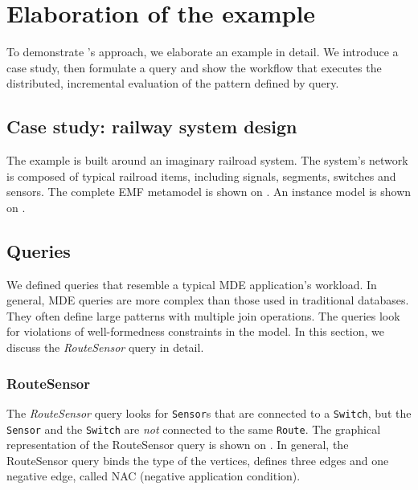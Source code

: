\section{Elaboration of the example}
\label{sec:elaboration}

To demonstrate \iqd{}'s approach, we elaborate an example in detail. We introduce a case study, then formulate a query and show the workflow that executes the distributed, incremental evaluation of the pattern defined by query.

\subsection{Case study: railway system design}
\label{subsec:casestudy}

The example is built around an imaginary railroad system. The system's network is composed of typical railroad items, including signals, segments, switches and sensors. The complete EMF metamodel is shown on . An instance model is shown on .



\subsection{Queries}

We defined queries that resemble a typical MDE application's workload. In general, MDE queries are more complex than those used in traditional databases. They often define large patterns with multiple join operations. The queries look for violations of well-formedness constraints in the model. In this section, we discuss the \textit{RouteSensor} query in detail.

\subsubsection{RouteSensor}


The \textit{RouteSensor} query looks for \texttt{Sensor}s that are connected to a \texttt{Switch}, but the \texttt{Sensor} and the \texttt{Switch} are \emph{not} connected to the same \texttt{Route}. The graphical representation of the RouteSensor query is shown on . In general, the RouteSensor query binds the type of the vertices, defines three edges and one negative edge, called NAC (negative application condition). 

